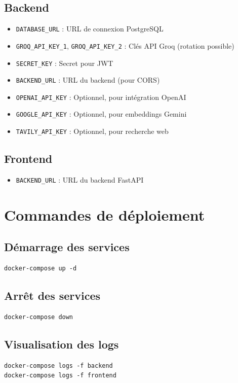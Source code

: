 \subsection{Backend}
\begin{itemize}
    \item \texttt{DATABASE\_URL} : URL de connexion PostgreSQL
    \item \texttt{GROQ\_API\_KEY\_1}, \texttt{GROQ\_API\_KEY\_2} : Clés API Groq (rotation possible)
    \item \texttt{SECRET\_KEY} : Secret pour JWT
    \item \texttt{BACKEND\_URL} : URL du backend (pour CORS)
    \item \texttt{OPENAI\_API\_KEY} : Optionnel, pour intégration OpenAI
    \item \texttt{GOOGLE\_API\_KEY} : Optionnel, pour embeddings Gemini
    \item \texttt{TAVILY\_API\_KEY} : Optionnel, pour recherche web
\end{itemize}

\subsection{Frontend}
\begin{itemize}
    \item \texttt{BACKEND\_URL} : URL du backend FastAPI
\end{itemize}

\section{Commandes de déploiement}

\subsection{Démarrage des services}
\begin{verbatim}
docker-compose up -d
\end{verbatim}

\subsection{Arrêt des services}
\begin{verbatim}
docker-compose down
\end{verbatim}

\subsection{Visualisation des logs}
\begin{verbatim}
docker-compose logs -f backend
docker-compose logs -f frontend
\end{verbatim}

